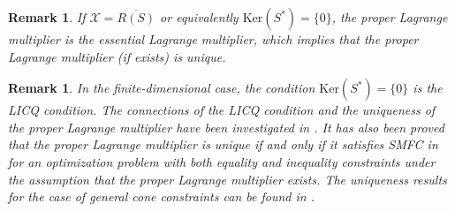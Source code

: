 \documentclass[leqno]{amsart}
\newtheorem{Remark}[Theorem]{Remark}
\theoremstyle{definition}
\begin{document}
\begin{Remark}
If $\mathcal{X} = \overline{R(S)}$ or equivalently $\mathrm{Ker}(S^*) = \{0\}$, the proper Lagrange multiplier is the essential Lagrange multiplier, which implies that the proper Lagrange multiplier (if exists) is unique.  
\end{Remark}

\begin{Remark}
In the finite-dimensional case, the condition $\mathrm{Ker}(S^*) = \{0\}$ is the LICQ condition. The connections of the LICQ condition and the uniqueness of the proper Lagrange multiplier have been investigated in \cite{wachsmuth2013licq}. It has also been proved that the proper Lagrange multiplier is unique if and only if it satisfies SMFC in \cite{kyparisis1985uniqueness} for an  optimization problem with both equality and inequality constraints under the assumption that the proper Lagrange multiplier exists. The uniqueness results for the case of general cone constraints can be found in \cite{shapiro1992perturbation, shapiro1997uniqueness}.
\end{Remark}
\end{document}
